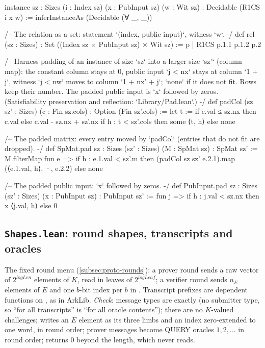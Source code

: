\begin{leancode}[fontsize=\scriptsize,label={\footnotesize Contract/R1CS.lean}]
instance {sz : Sizes} (i : Index sz) (x : PubInput sz) (w : Wit sz) : Decidable (R1CS i x w) :=
  inferInstanceAs (Decidable (∀ _, _))

/-- The relation as a set: statement `(index, public input)`, witness `w`. -/
def rel (sz : Sizes) : Set ((Index sz × PubInput sz) × Wit sz) := {p | R1CS p.1.1 p.1.2 p.2}

/-- Harness padding of an instance of size `sz` into a larger size `sz'` (column map): the
constant column stays at 0, public input `j < nx` stays at column `1 + j`, witness `j < nw` moves
to column `1 + nx' + j`; `none` if it does not fit. Rows keep their number. The padded public
input is `x` followed by zeros. (Satisfiability preservation and reflection: `Library/Pad.lean`.) -/
def padCol (sz sz' : Sizes) (c : Fin sz.cols) : Option (Fin sz'.cols) :=
  let t := if c.val ≤ sz.nx then c.val else c.val - sz.nx + sz'.nx
  if h : t < sz'.cols then some ⟨t, h⟩ else none

/-- The padded matrix: every entry moved by `padCol` (entries that do not fit are dropped). -/
def SpMat.pad {sz : Sizes} (sz' : Sizes) (M : SpMat sz) : SpMat sz' :=
  M.filterMap fun e => if h : e.1.val < sz'.m then (padCol sz sz' e.2.1).map (⟨e.1.val, h⟩, ·, e.2.2) else none

/-- The padded public input: `x` followed by zeros. -/
def PubInput.pad {sz : Sizes} (sz' : Sizes) (x : PubInput sz) : PubInput sz' :=
  fun j => if h : j.val < sz.nx then x ⟨j.val, h⟩ else 0
\end{leancode}

\subsection{\texttt{Shapes.lean}: round shapes, transcripts and oracles}

The fixed round menu (\cref{subsec:proto-rounds}): a prover round sends a raw vector of
$2^{\mathit{logLen}}$ elements of $K$, read in leaves of $2^{\mathit{logLeaf}}$; a verifier round
sends $n_E$ elements of $E$ and one $b$-bit index per $b$ in . Transcript prefixes are
dependent functions on , as in ArkLib. \emph{Check}: message types are exactly
 (no submitter type, so \enquote{for all transcripts} is \enquote{for all oracle
contents}); there are no $K$-valued challenges;  writes an $E$ element as its
three limbs and an index zero-extended to one word, in round order; prover messages become QUERY
oracles $1,2,\dots$ in round order;  returns $0$ beyond the length, which
 never reads.

